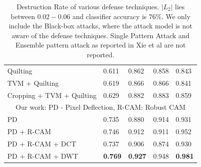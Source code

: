 \begin{table}[H]
\begin{tabular}{lllll}
\small{Quilting}        & 0.611          & 0.862          & 0.858          & 0.843          \\
\small{TVM + Quilting}& 0.619          & 0.866          & 0.866          & 0.841          \\
\small{Cropping + TVM + Quilting} & 0.629          & 0.882          & 0.883          & 0.859          \\ \hline
\multicolumn{5}{c}{Our work: PD - Pixel Deflection, R-CAM: Robust CAM}                                                                    \\ \hline
\small{PD}  & 0.735          & 0.880          & 0.914          & 0.931          \\
\small{PD + R-CAM}       & 0.746          & 0.912          & 0.911          & 0.952          \\
\small{PD + R-CAM + DCT}       & 0.737          & 0.906          & 0.874         & 0.930          \\
\small{PD + R-CAM + DWT}  & \textbf{0.769} & \textbf{0.927} & 0.948          & \textbf{0.981} \\ \hline
\end{tabular}
\caption{Destruction Rate of various defense techniques. $|L_2|$ lies between $0.02 - 0.06$ and classifier accuracy is $76\%$.
We only include the Black-box attacks, where the attack model is not aware of the defense techniques. Single Pattern Attack and Ensemble pattern attack as reported in Xie et al \cite{MitigatingAnon208} are not reported.}
\end{table}

